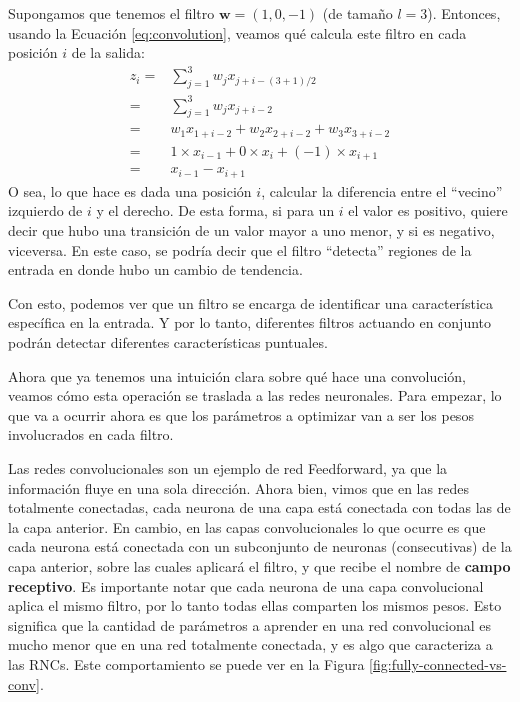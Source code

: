 \documentclass[../../main.tex]{subfiles}
\begin{document}
Supongamos que tenemos el filtro \(\bm{w} = (1, 0, -1)\) (de tamaño \(l=3\)). Entonces,
usando la Ecuación \ref{eq:convolution}, veamos qué calcula este filtro en cada
posición \(i\) de la salida:
\begin{align*}
    z_i =& \sum_{j=1}^3 w_j x_{j+i-(3+1)/2} \\
        =& \sum_{j=1}^3 w_j x_{j+i-2} \\
        =& w_1 x_{1+i-2} + w_2 x_{2+i-2} + w_3 x_{3+i-2} \\
        =& 1 \times x_{i-1} + 0 \times x_i + (-1) \times x_{i+1} \\
        =& x_{i-1} - x_{i+1}
\end{align*}
O sea, lo que hace es dada una posición \(i\), calcular la diferencia entre el ``vecino''
izquierdo de \(i\) y el derecho. De esta forma, si para un \(i\) el valor es positivo,
quiere decir que hubo una transición de un valor mayor a uno menor, y si es negativo,
viceversa. En este caso, se podría decir que el filtro ``detecta'' regiones de la entrada
en donde hubo un cambio de tendencia.

Con esto, podemos ver que un filtro se encarga de identificar una característica
específica en la entrada. Y por lo tanto, diferentes filtros actuando en conjunto podrán
detectar diferentes características puntuales.

Ahora que ya tenemos una intuición clara sobre qué hace una convolución, veamos
cómo esta operación se traslada a las redes neuronales. Para empezar, lo que va a
ocurrir ahora es que los parámetros a optimizar van a ser los pesos involucrados
en cada filtro.

Las redes convolucionales son un ejemplo de red Feedforward, ya que la información fluye
en una sola dirección. Ahora bien, vimos que en las redes totalmente conectadas, cada
neurona de una capa está conectada con todas las de la capa anterior. En cambio, en las
capas convolucionales lo que ocurre es que cada neurona está conectada con un subconjunto de
neuronas (consecutivas) de la capa anterior, sobre las cuales aplicará el filtro, y que
recibe el nombre de \textbf{campo receptivo}. Es importante notar que cada neurona de una
capa convolucional aplica el mismo filtro, por lo tanto todas ellas comparten los mismos
pesos. Esto significa que la cantidad de parámetros a aprender en una red convolucional es
mucho menor que en una red totalmente conectada, y es algo que caracteriza a las RNCs.
Este comportamiento se puede ver en la Figura \ref{fig:fully-connected-vs-conv}.
\end{document}
